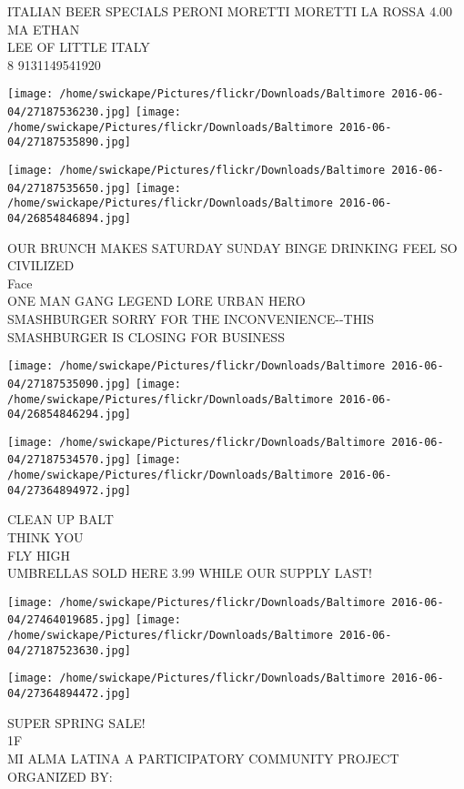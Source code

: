 \documentclass[10pt,letterpaper]{article}
\begin{document}
ITALIAN BEER SPECIALS PERONI MORETTI MORETTI LA ROSSA 4.00\\
MA ETHAN\\
LEE OF LITTLE ITALY\\
8 9131149541920
\pagebreak

\texttt{[image: /home/swickape/Pictures/flickr/Downloads/Baltimore 2016-06-04/27187536230.jpg]}
\texttt{[image: /home/swickape/Pictures/flickr/Downloads/Baltimore 2016-06-04/27187535890.jpg]}

\texttt{[image: /home/swickape/Pictures/flickr/Downloads/Baltimore 2016-06-04/27187535650.jpg]}
\texttt{[image: /home/swickape/Pictures/flickr/Downloads/Baltimore 2016-06-04/26854846894.jpg]}

OUR BRUNCH MAKES SATURDAY SUNDAY BINGE DRINKING FEEL SO CIVILIZED\\
Face\\
ONE MAN GANG LEGEND LORE URBAN HERO\\
SMASHBURGER SORRY FOR THE INCONVENIENCE{-}{-}THIS SMASHBURGER IS CLOSING FOR BUSINESS
\pagebreak

\texttt{[image: /home/swickape/Pictures/flickr/Downloads/Baltimore 2016-06-04/27187535090.jpg]}
\texttt{[image: /home/swickape/Pictures/flickr/Downloads/Baltimore 2016-06-04/26854846294.jpg]}

\texttt{[image: /home/swickape/Pictures/flickr/Downloads/Baltimore 2016-06-04/27187534570.jpg]}
\texttt{[image: /home/swickape/Pictures/flickr/Downloads/Baltimore 2016-06-04/27364894972.jpg]}

CLEAN UP BALT\\
THINK YOU\\
FLY HIGH\\
UMBRELLAS SOLD HERE 3.99 WHILE OUR SUPPLY LAST!
\pagebreak

\texttt{[image: /home/swickape/Pictures/flickr/Downloads/Baltimore 2016-06-04/27464019685.jpg]}
\texttt{[image: /home/swickape/Pictures/flickr/Downloads/Baltimore 2016-06-04/27187523630.jpg]}

\texttt{[image: /home/swickape/Pictures/flickr/Downloads/Baltimore 2016-06-04/27364894472.jpg]}

SUPER SPRING SALE!\\
1F\\
MI ALMA LATINA A PARTICIPATORY COMMUNITY PROJECT ORGANIZED BY:
\pagebreak
\end{document}

